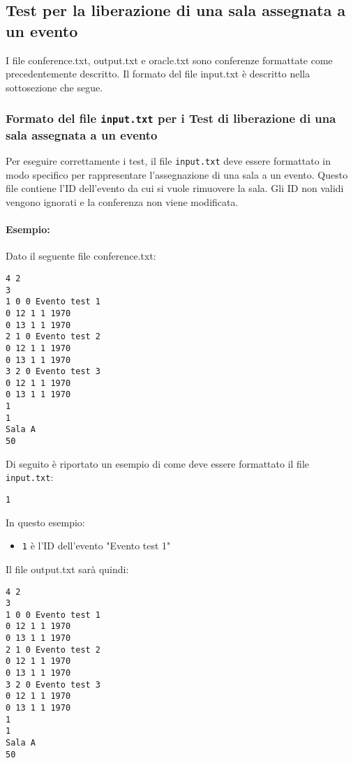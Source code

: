 \documentclass[11pt]{scrartcl} %
\begin{document}
\subsection{Test per la liberazione di una sala assegnata a un evento}

I file conference.txt, output.txt e oracle.txt sono conferenze formattate come precedentemente descritto. Il formato del file input.txt è descritto nella sottosezione che segue.

\subsubsection{Formato del file \texttt{input.txt} per i Test di  liberazione di una sala assegnata a un evento}

Per eseguire correttamente i test, il file \texttt{input.txt} deve essere formattato in modo specifico per rappresentare l'assegnazione di una sala a un evento. Questo file contiene l'ID dell'evento da cui si vuole rimuovere la sala.
Gli ID non validi vengono ignorati e la conferenza non viene modificata.


\paragraph{Esempio:}
Dato il seguente file conference.txt:
\begin{lstlisting}
4 2
3
1 0 0 Evento test 1
0 12 1 1 1970
0 13 1 1 1970
2 1 0 Evento test 2
0 12 1 1 1970
0 13 1 1 1970
3 2 0 Evento test 3
0 12 1 1 1970
0 13 1 1 1970
1
1
Sala A
50
\end{lstlisting}

Di seguito è riportato un esempio di come deve essere formattato il file \texttt{input.txt}:

\begin{lstlisting}
1
\end{lstlisting}

In questo esempio:
\begin{itemize}
    \item \texttt{1} è l'ID dell'evento "Evento test 1"
\end{itemize}
Il file output.txt sarà quindi:

\begin{lstlisting}
4 2
3
1 0 0 Evento test 1
0 12 1 1 1970
0 13 1 1 1970
2 1 0 Evento test 2
0 12 1 1 1970
0 13 1 1 1970
3 2 0 Evento test 3
0 12 1 1 1970
0 13 1 1 1970
1
1
Sala A
50
\end{lstlisting}
\end{document}
